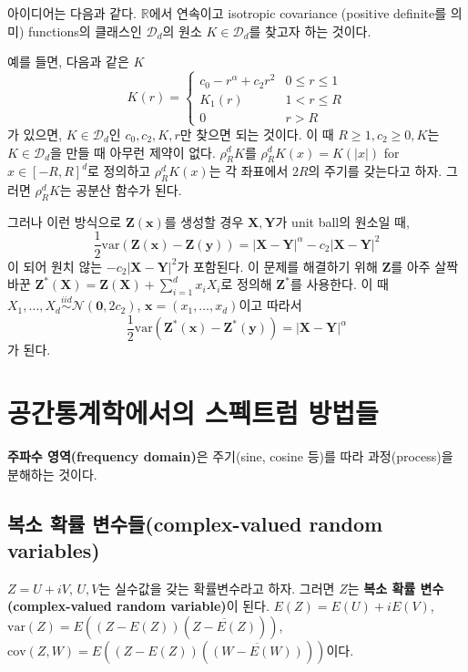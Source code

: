 \documentclass[b5paper,]{scrbook}
\theoremstyle{plain}
\theoremstyle{definition}
\numberwithin{equation}{section}
\begin{document}
아이디어는 다음과 같다. \(\mathbb{R}\)에서 연속이고 isotropic covariance (positive definite를 의미) functions의 클래스인 \(\mathcal{D}_{d}\)의 원소 \(K\in\mathcal{D}_{d}\)를 찾고자 하는 것이다.

예를 들면, 다음과 같은 \(K\)
\[
K(r)=
\begin{cases}
c_{0}-r^{\alpha}+c_{2}r^{2} & 0 \leq r \leq 1 \\
K_{1}(r) & 1 < r \leq R \\
0 & r > R
\end{cases}
\]
가 있으면, \(K\in \mathcal{D}_{d}\)인 \(c_{0}, c_{2}, K, r\)만 찾으면 되는 것이다. 이 때 \(R\geq 1, c_{2}\geq 0, K\)는 \(K\in\mathcal{D}_{d}\)을 만들 때 아무런 제약이 없다. \(\rho_{R}^{d}K\)를 \(\rho_{R}^{d}K(x)=K(|x|)\) for \(x\in [-R,R]^{d}\)로 정의하고 \(\rho_{R}^{d}K(x)\)는 각 좌표에서 \(2R\)의 주기를 갖는다고 하자. 그러면 \(\rho_{R}^{d}K\)는 공분산 함수가 된다.

그러나 이런 방식으로 \(\mathbf{Z}(\mathbf{x})\)를 생성할 경우 \(\mathbf{X},\mathbf{Y}\)가 unit ball의 원소일 때,
\[\frac{1}{2}\text{var}(\mathbf{Z}(\mathbf{x})-\mathbf{Z}(\mathbf{y}))=|\mathbf{X-Y}|^{\alpha}-c_{2}|\mathbf{X-Y}|^{2}\]
이 되어 원치 않는 \(-c_{2}|\mathbf{X-Y}|^{2}\)가 포함된다. 이 문제를 해결하기 위해 \(\mathbf{Z}\)를 아주 살짝 바꾼 \(\mathbf{Z}^{*}(\mathbf{X})=\mathbf{Z}(\mathbf{X})+\sum_{i=1}^{d}x_{i}X_{i}\)로 정의해 \(\mathbf{Z}^{*}\)를 사용한다. 이 때 \(X_{1},\ldots, X_{d}\stackrel{iid}{\sim}\mathcal{N}(\mathbf{0}, 2c_{2})\), \(\mathbf{x}=(x_{1},\ldots, x_{d})\)이고 따라서
\[\frac{1}{2}\text{var}(\mathbf{Z}^{*}(\mathbf{x})-\mathbf{Z}^{*}(\mathbf{y}))=|\mathbf{X-Y}|^{\alpha}\]
가 된다.

\hypertarget{spatialspectral}{%
\chapter{공간통계학에서의 스펙트럼 방법들}\label{spatialspectral}}

\textbf{주파수 영역(frequency domain)}은 주기(sine, cosine 등)를 따라 과정(process)을 분해하는 것이다.

\hypertarget{--complex-valued-random-variables}{%
\section{복소 확률 변수들(complex-valued random variables)}\label{--complex-valued-random-variables}}

\(Z=U+iV\), \(U ,V\)는 실수값을 갖는 확률변수라고 하자. 그러면 \(Z\)는 \textbf{복소 확률 변수(complex-valued random variable)}이 된다. \(E(Z)=E(U)+iE(V)\), \(\text{var}(Z)=E((Z-E(Z))(\overline{Z-E(Z)}))\), \(\text{cov}(Z,W)=E((Z-E(Z))(\overline{(W-E(W))}))\)이다.
\end{document}
